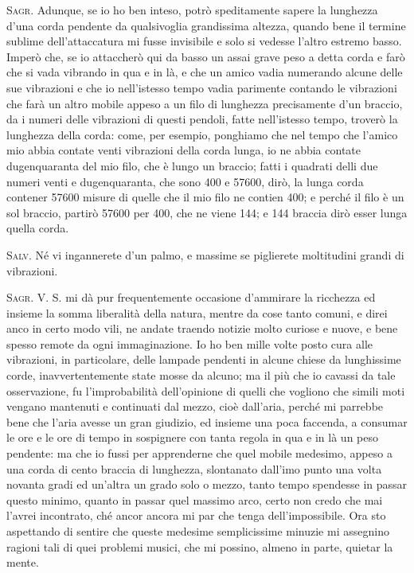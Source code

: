 \documentclass[11pt,twoside,openany]{book}
\newcommand{\speaker}[1]{\textcolor{rubric}{\textsc{#1}}\space}
\begin{document}
\speaker{Sagr.} Adunque, se io ho ben inteso, potrò speditamente sapere la lunghezza d'una corda pendente da qualsivoglia grandissima altezza, quando bene il termine sublime dell'attaccatura mi fusse invisibile e solo si vedesse l'altro estremo basso. Imperò che, se io attaccherò qui da basso un assai grave peso a detta corda e farò che si vada vibrando in qua e in là, e che un amico vadia numerando alcune delle sue vibrazioni e che io nell'istesso tempo vadia parimente contando le vibrazioni che farà un altro mobile appeso a un filo di lunghezza precisamente d'un braccio, da i numeri delle vibrazioni di questi pendoli, fatte nell'istesso tempo, troverò la lunghezza della corda: come, per esempio, ponghiamo che nel tempo che l'amico mio abbia contate venti vibrazioni della corda lunga, io ne abbia contate dugenquaranta del mio filo, che è lungo un braccio; fatti i quadrati delli due numeri venti e dugenquaranta, che sono 400 e 57600, dirò, la lunga corda contener 57600 misure di quelle che il mio filo ne contien 400; e perché il filo è un sol braccio, partirò 57600 per 400, che ne viene 144; e 144 braccia dirò esser lunga quella corda.

\speaker{Salv.} Né vi ingannerete d'un palmo, e massime se piglierete moltitudini grandi di vibrazioni.

\speaker{Sagr.} V. S. mi dà pur frequentemente occasione d'ammirare la ricchezza ed insieme la somma liberalità della natura, mentre da cose tanto comuni, e direi anco in certo modo vili, ne andate traendo notizie molto curiose e nuove, e bene spesso remote da ogni immaginazione. Io ho ben mille volte posto cura alle vibrazioni, in particolare, delle lampade pendenti in alcune chiese da lunghissime corde, inavvertentemente state mosse da alcuno; ma il più che io cavassi da tale osservazione, fu l'improbabilità dell'opinione di quelli che vogliono che simili moti vengano mantenuti e continuati dal mezzo, cioè dall'aria, perché mi parrebbe bene che l'aria avesse un gran giudizio, ed insieme una poca faccenda, a consumar le ore e le ore di tempo in sospignere con tanta regola in qua e in là un peso pendente: ma che io fussi per apprenderne che quel mobile medesimo, appeso a una corda di cento braccia di lunghezza, slontanato dall'imo punto una volta novanta gradi ed un'altra un grado solo o mezzo, tanto tempo spendesse in passar questo minimo, quanto in passar quel massimo arco, certo non credo che mai l'avrei incontrato, ché ancor ancora mi par che tenga dell'impossibile. Ora sto aspettando di sentire che queste medesime semplicissime minuzie mi assegnino ragioni tali di quei problemi musici, che mi possino, almeno in parte, quietar la mente.
\end{document}
